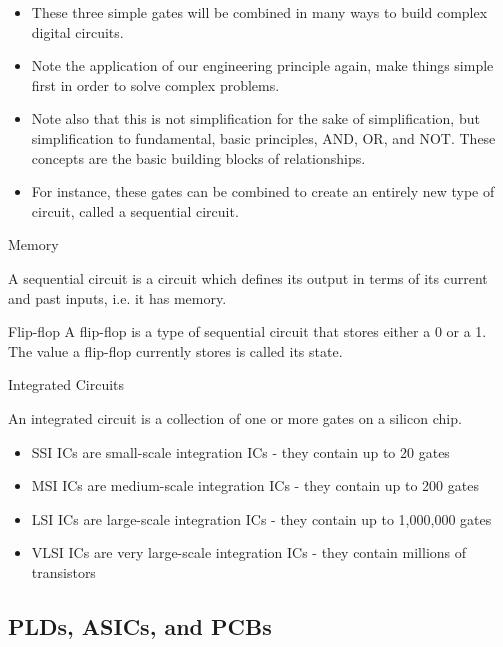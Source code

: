 \begin{itemize}
  \item These three simple gates will be combined in many ways to build complex digital circuits.
  \item Note the application of our engineering principle again, make things simple first in order to solve complex problems.
  \item Note also that this is not simplification for the sake of simplification, but simplification to fundamental, basic principles, AND, OR, and NOT.  These concepts are the basic building blocks of relationships.
  \item For instance, these gates can be combined to create an entirely new type of circuit, called a sequential circuit.
\end{itemize}

\begin{frame}{Memory}
  \begin{definition}
    A \alert{sequential circuit} is a circuit which defines its output in terms of its current and past inputs, i.e. it has memory.
  \end{definition}
  \begin{block}{Flip-flop}
    A \alert{flip-flop} is a type of sequential circuit that stores either a 0 or a 1.  The value a flip-flop currently stores is called its \alert{state}.
  \end{block}
\end{frame}

\begin{frame}{Integrated Circuits}
  \begin{definition}
    An \alert{integrated circuit} is a collection of one or more gates on a silicon chip.
  \end{definition}
  \begin{itemize}
    \item SSI ICs are small-scale integration ICs - they contain up to 20 gates
    \item MSI ICs are medium-scale integration ICs - they contain up to 200 gates
    \item LSI ICs are large-scale integration ICs - they contain up to 1,000,000 gates
    \item VLSI ICs are very large-scale integration ICs - they contain millions of transistors 
  \end{itemize}
\end{frame}

\subsection{PLDs, ASICs, and PCBs}

